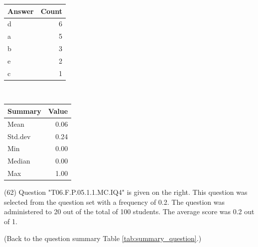 \documentclass[12pt,nohyper]{tufte-handout}\usepackage[]{graphicx}\usepackage[]{color}
\begin{document}
\begin{center}%
\begin{tabular}{lr}
  \hline
Answer & Count \\ 
  \hline
d &   6 \\ 
  a &   5 \\ 
  b &   3 \\ 
  e &   2 \\ 
  c &   1 \\ 
   \hline
\end{tabular}
~~~~~~~~%
\begin{tabular}{lr}
  \hline
Summary & Value \\ 
  \hline
Mean & 0.06 \\ 
  Std.dev & 0.24 \\ 
  Min & 0.00 \\ 
  Median & 0.00 \\ 
  Max & 1.00 \\ 
   \hline
\end{tabular}
\end{center}\newpage{} (62) Question "T06.F.P.05.1.1.MC.IQ4" is given on the right. This question was selected from the question set with a frequency of 0.2. The question was administered to 20 out of the total of 100 students. The average score was 0.2 out of 1.

 (Back to the question summary Table \ref{tab:summary_question}.)
\end{document}
